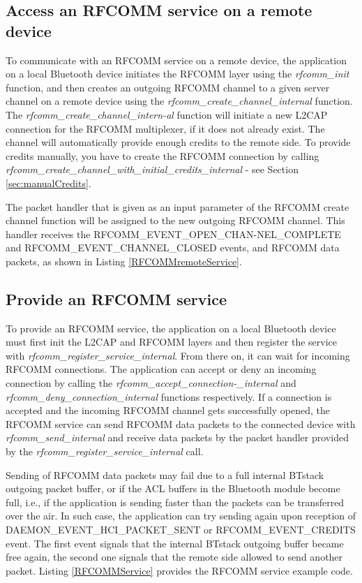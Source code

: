 \documentclass[a4paper,titlepage,oneside,12pt]{amsart} %
\begin{document}
\subsection{Access an RFCOMM service on a remote device}

To communicate with an RFCOMM service on a remote device, the application on a local Bluetooth device initiates the RFCOMM layer using the \emph{rfcomm\_init} function, and then creates an outgoing RFCOMM channel to a given server channel on a remote device using the \emph{rfcomm\_create\_channel\_internal} function. The  \emph{rfcomm\_create\_channel\_intern-al} function will initiate a new L2CAP connection for the RFCOMM multiplexer, if it does not already exist. The channel will automatically provide enough credits to the remote side. To provide credits manually, you have to create the RFCOMM connection by calling \emph{rfcomm\_create\_channel\_with\_initial\_credits\_internal} - see Section \ref{sec:manualCredits}.


The packet handler that is given as an input parameter of the RFCOMM create channel function will be assigned to the new outgoing \mbox{RFCOMM} channel. This handler receives the RFCOMM\_EVENT\_OPEN\_CHAN-NEL\_COMPLETE and RFCOMM\_EVENT\_CHANNEL\_CLOSED events, and RFCOMM data packets, as shown in Listing \ref{RFCOMMremoteService}.

\subsection{Provide an RFCOMM service}
\label{section:rfcomm_service}

To provide an RFCOMM service, the application on a local Bluetooth device must first init the L2CAP and RFCOMM layers and then register the service with \emph{rfcomm\_register\_service\_internal}. From there on, it can wait for incoming RFCOMM connections. The application can accept or deny an incoming connection by calling the \emph{rfcomm\_accept\_connection-\_internal} and \emph{rfcomm\_deny\_connection\_internal} functions respectively. If a connection is accepted and the incoming RFCOMM channel gets successfully opened, the RFCOMM service can send RFCOMM data packets to the connected device with \emph{rfcomm\_send\_internal} and receive data packets by the packet handler provided by the \emph{rfcomm\_register\_service\_internal} call.

Sending of RFCOMM data packets may fail due to a full internal BTstack outgoing packet buffer, or if the ACL buffers in the Bluetooth module become full, i.e., if the application is sending faster than the packets can be transferred over the air. In such case, the application can try sending again upon reception of DAEMON\_EVENT\_HCI\_PACKET\_SENT or RFCOMM\_EVENT\_CREDITS event. The first event signals that the internal BTstack outgoing buffer became free again, the second one signals that the remote side allowed to send another  packet. Listing \ref{RFCOMMService} provides the RFCOMM service example code.
\end{document}

